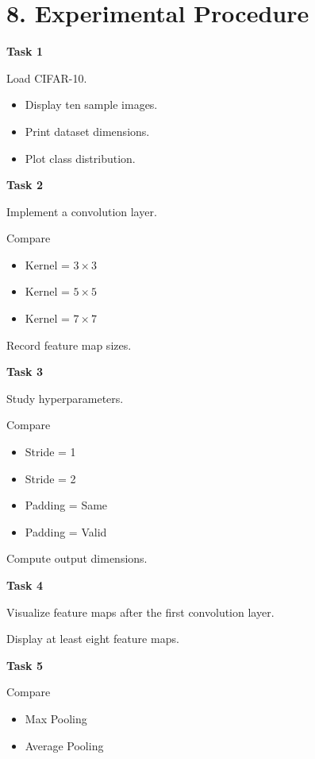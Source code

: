 \documentclass[11pt]{article}
\begin{document}
\section*{8. Experimental Procedure}

\textbf{Task 1}

Load CIFAR-10.

\begin{itemize}
\item Display ten sample images.
\item Print dataset dimensions.
\item Plot class distribution.
\end{itemize}

\bigskip

\textbf{Task 2}

Implement a convolution layer.

Compare

\begin{itemize}
\item Kernel = $3\times3$
\item Kernel = $5\times5$
\item Kernel = $7\times7$
\end{itemize}

Record feature map sizes.

\bigskip

\textbf{Task 3}

Study hyperparameters.

Compare

\begin{itemize}
\item Stride = 1
\item Stride = 2
\item Padding = Same
\item Padding = Valid
\end{itemize}

Compute output dimensions.

\bigskip

\textbf{Task 4}

Visualize feature maps after the first convolution layer.

Display at least eight feature maps.

\bigskip

\textbf{Task 5}

Compare

\begin{itemize}
\item Max Pooling
\item Average Pooling
\end{itemize}
\end{document}
